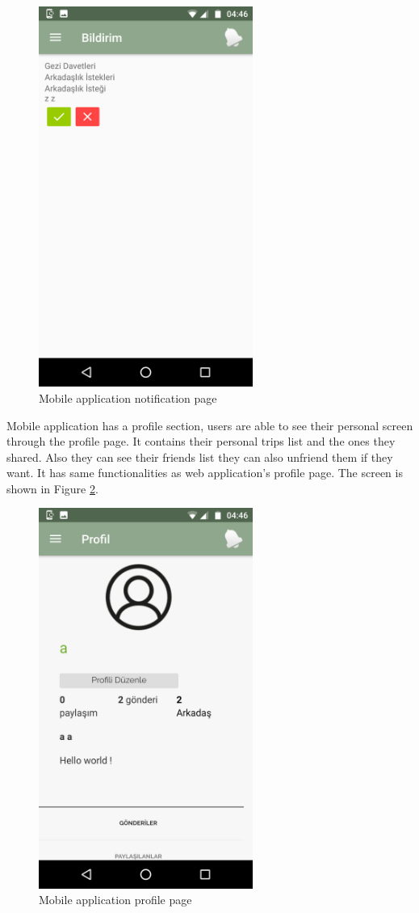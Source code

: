 \begin{figure}[!htbp]
\centering
\includegraphics[width=70mm,scale=0.7]{projectChapters/images/notificationMobile.png}
\caption{Mobile application notification page}
\label{fig:notificationMobile}
\end{figure}

\newpage

Mobile application has a profile section, users are able to see their personal screen through the profile page. It contains their personal trips list and the ones they shared. Also they can see their friends list they can also unfriend them if they want. It has same functionalities as web application's profile page. The screen is shown in Figure 
\ref{fig:profileMobile}.

\begin{figure}[!htbp]
\centering
\includegraphics[width=70mm,scale=0.7]{projectChapters/images/profileMobile.png}
\caption{Mobile application profile page}
\label{fig:profileMobile}
\end{figure}

